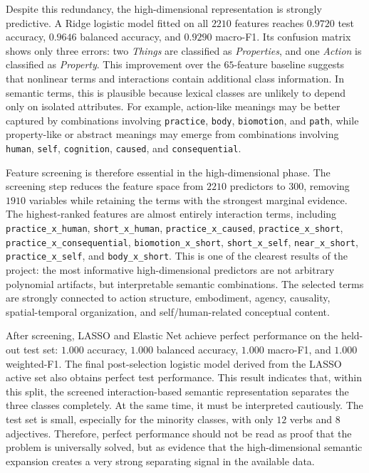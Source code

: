 \documentclass{ipgpmaster}
\begin{document}
Despite this redundancy, the high-dimensional representation is strongly predictive. A Ridge logistic model fitted on all \(2210\) features reaches \(0.9720\) test accuracy, \(0.9646\) balanced accuracy, and \(0.9290\) macro-F1. Its confusion matrix shows only three errors: two \emph{Things} are classified as \emph{Properties}, and one \emph{Action} is classified as \emph{Property}. This improvement over the \(65\)-feature baseline suggests that nonlinear terms and interactions contain additional class information. In semantic terms, this is plausible because lexical classes are unlikely to depend only on isolated attributes. For example, action-like meanings may be better captured by combinations involving \texttt{practice}, \texttt{body}, \texttt{biomotion}, and \texttt{path}, while property-like or abstract meanings may emerge from combinations involving \texttt{human}, \texttt{self}, \texttt{cognition}, \texttt{caused}, and \texttt{consequential}.

Feature screening is therefore essential in the high-dimensional phase. The screening step reduces the feature space from \(2210\) predictors to \(300\), removing \(1910\) variables while retaining the terms with the strongest marginal evidence. The highest-ranked features are almost entirely interaction terms, including \texttt{practice\_x\_human}, \texttt{short\_x\_human}, \texttt{practice\_x\_caused}, \texttt{practice\_x\_short}, \newline \texttt{practice\_x\_consequential}, \texttt{biomotion\_x\_short}, \texttt{short\_x\_self}, \texttt{near\_x\_short}, \texttt{practice\_x\_self}, and \texttt{body\_x\_short}. This is one of the clearest results of the project: the most informative high-dimensional predictors are not arbitrary polynomial artifacts, but interpretable semantic combinations. The selected terms are strongly connected to action structure, embodiment, agency, causality, spatial-temporal organization, and self/human-related conceptual content.

After screening, LASSO and Elastic Net achieve perfect performance on the held-out test set: \(1.000\) accuracy, \(1.000\) balanced accuracy, \(1.000\) macro-F1, and \(1.000\) weighted-F1. The final post-selection logistic model derived from the LASSO active set also obtains perfect test performance. This result indicates that, within this split, the screened interaction-based semantic representation separates the three classes completely. At the same time, it must be interpreted cautiously. The test set is small, especially for the minority classes, with only \(12\) verbs and \(8\) adjectives. Therefore, perfect performance should not be read as proof that the problem is universally solved, but as evidence that the high-dimensional semantic expansion creates a very strong separating signal in the available data.
\end{document}
